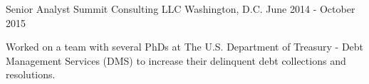 \begin{cventries}
\cventry
{Senior Analyst} %
{Summit Consulting LLC} %
{Washington, D.C.} %
{June 2014 - October 2015} %
{ %
\begin{cvitems}
\item {Worked on a team with several PhDs at The U.S. Department of Treasury - Debt Management Services (DMS) to increase their delinquent debt collections and resolutions.}
\end{cvitems}
}




\end{cventries}
